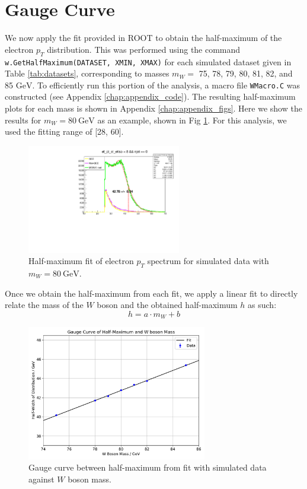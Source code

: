 \documentclass[a4paper]{report}
\numberwithin{equation}{section}
\begin{document}
\section{Gauge Curve}

We now apply the fit provided in ROOT to obtain the half-maximum of the electron $p_T$ distribution. This was performed using the 
command \texttt{w.GetHalfMaximum(DATASET, XMIN, XMAX)} for each simulated dataset given in Table \ref{tab:datasets}, 
corresponding to masses $m_W =$ 75, 78, 79, 80, 81, 82, and 85 $\si{\giga\electronvolt}$. To efficiently run this portion 
of the analysis, a macro file \texttt{WMacro.C} was constructed (see Appendix \ref{chap:appendix_code}). The resulting half-maximum plots 
for each mass is shown in Appendix \ref{chap:appendix_figs}. Here we show the results for $m_W = \SI{80}{\giga\electronvolt}$ as 
an example, shown in Fig \ref{fig:hm_m80}. For this analysis, we used the fitting range of [28, 60].

\begin{figure}[htb!]
    \centering
    \includegraphics[width=0.6\textwidth]{hm_80.pdf}
    \caption{Half-maximum fit of electron $p_T$ spectrum for simulated data with $m_W = \SI{80}{\giga\electronvolt}$.}
    \label{fig:hm_m80}
\end{figure}

Once we obtain the half-maximum from each fit, we apply a linear fit to directly relate the mass of the $W$ boson and the 
obtained half-maximum $h$ as such: 
\begin{equation}
    h = a \cdot m_W + b
    \label{eq:half_max}
\end{equation}

\begin{figure}[htpb!]
    \centering
    \includegraphics[width=0.7\textwidth]{gauge_curve.pdf}
    \caption{Gauge curve between half-maximum from fit with simulated data against $W$ boson mass.}
    \label{fig:gauge_curve}
\end{figure}
\end{document}
